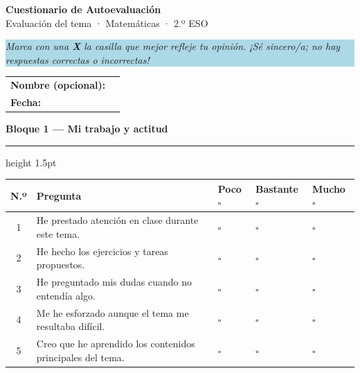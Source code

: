 \documentclass[a4paper,11pt]{article}
\newcommand{\bloqueheader}[2]{%
  \vspace{8pt}
  {\large\bfseries\color{#1} #2}
  \vspace{4pt}
  \hrule height 1.5pt \relax
  \vspace{6pt}
}
\begin{document}
\begin{center}
  {\LARGE\bfseries\color{headerblue} Cuestionario de Autoevaluación}\\[4pt]
  {\large\color{headerblue} Evaluación del tema · Matemáticas · 2.º ESO}
\end{center}

\vspace{4pt}
\noindent\colorbox{lightblue}{\parbox{\dimexpr\linewidth-2\fboxsep}{%
  \small\itshape\color{headerblue}
  \quad Marca con una \textbf{X} la casilla que mejor refleje tu opinión.
  ¡Sé sincero/a; no hay respuestas correctas o incorrectas!
}}

\vspace{10pt}

\noindent
\begin{tabularx}{\linewidth}{lX}
  \textbf{Nombre (opcional):} & \underline{\hspace{7cm}} \\[6pt]
  \textbf{Fecha:}             & \underline{\hspace{7cm}} \\
\end{tabularx}

\vspace{12pt}

\bloqueheader{blockgreen}{Bloque 1 — Mi trabajo y actitud}

\renewcommand{\arraystretch}{1.5}
\begin{tabularx}{\linewidth}{>{\footnotesize}c X >{\centering\arraybackslash}m{2cm} >{\centering\arraybackslash}m{2cm} >{\centering\arraybackslash}m{2cm}}
  \toprule
  \textbf{N.º} & \textbf{Pregunta} 
    & \textbf{Poco \(\square\)} 
    & \textbf{Bastante \(\square\)} 
    & \textbf{Mucho \(\square\)} \\
  \midrule
  1 & He prestado atención en clase durante este tema.           & $\square$ & $\square$ & $\square$ \\
  \rowcolor{lightgray}
  2 & He hecho los ejercicios y tareas propuestos.               & $\square$ & $\square$ & $\square$ \\
  3 & He preguntado mis dudas cuando no entendía algo.           & $\square$ & $\square$ & $\square$ \\
  \rowcolor{lightgray}
  4 & Me he esforzado aunque el tema me resultaba difícil.       & $\square$ & $\square$ & $\square$ \\
  5 & Creo que he aprendido los contenidos principales del tema. & $\square$ & $\square$ & $\square$ \\
  \bottomrule
\end{tabularx}
\end{document}
